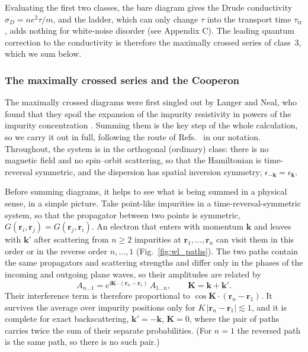 Evaluating the first two classes, the bare diagram gives the Drude conductivity $\sigma_D=ne^2\tau/m$, and the ladder, which can only change $\tau$ into the transport time $\tau_{\mathrm{tr}}$, adds nothing for white-noise disorder (see Appendix C). The leading quantum correction to the conductivity is therefore the maximally crossed series of class~3, which we sum below.

\subsubsection*{The maximally crossed series and the Cooperon}

The maximally crossed diagrams were first singled out by Langer and Neal, who found that they spoil the expansion of the impurity resistivity in powers of the impurity concentration \cite{LangerNeal1966,Bergmann1984}. Summing them is the key step of the whole calculation, so we carry it out in full, following the route of Refs.~\cite{BruusFlensberg,Coleman2015,LeeRamakrishnan1985} in our notation. Throughout, the system is in the orthogonal (ordinary) class: there is no magnetic field and no spin--orbit scattering, so that the Hamiltonian is time-reversal symmetric, and the dispersion has spatial inversion symmetry; $\epsilon_{-\mathbf k}=\epsilon_{\mathbf k}$.

Before summing diagrams, it helps to see what is being summed in a physical sense, in a simple picture. Take point-like impurities in a time-reversal-symmetric system, so that the propagator between two points is symmetric, $G(\mathbf r_i,\mathbf r_j)=G(\mathbf r_j,\mathbf r_i)$. An electron that enters with momentum $\mathbf k$ and leaves with $\mathbf k'$ after scattering from $n\ge2$ impurities at $\mathbf r_1,\dots,\mathbf r_n$ can visit them in this order or in the reverse order $n,\dots,1$ (Fig.~\ref{fig:wl_paths}). The two paths contain the same propagators and scattering strengths and differ only in the phases of the incoming and outgoing plane waves, so their amplitudes are related by
\[
A_{n\dots1}=e^{\mathrm{i}\mathbf K\cdot(\mathbf r_n-\mathbf r_1)}\,A_{1\dots n},\qquad\mathbf K=\mathbf k+\mathbf k'.
\]
Their interference term is therefore proportional to $\cos\mathbf K\cdot(\mathbf r_n-\mathbf r_1)$. It survives the average over impurity positions only for $K\,|\mathbf r_n-\mathbf r_1|\lesssim1$, and it is complete for exact backscattering, $\mathbf k'=-\mathbf k$, $\mathbf K=0$, where the pair of paths carries twice the sum of their separate probabilities. (For $n=1$ the reversed path is the same path, so there is no such pair.)

